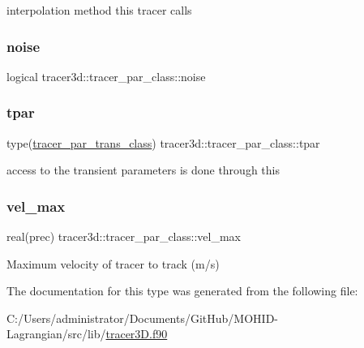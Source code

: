 interpolation method this tracer calls 

\mbox{\label{structtracer3d_1_1tracer__par__class_af258b7ca349ce911511dbd89b24606f7}} 
\subsubsection{\texorpdfstring{noise}{noise}}
{\footnotesize\ttfamily logical tracer3d\+::tracer\+\_\+par\+\_\+class\+::noise\hspace{0.3cm}{\ttfamily [private]}}

\mbox{\label{structtracer3d_1_1tracer__par__class_a4486f0959101435f0fdeb1c845d4bbf4}} 
\subsubsection{\texorpdfstring{tpar}{tpar}}
{\footnotesize\ttfamily type(\mbox{\hyperlink{structtracer3d_1_1tracer__par__trans__class}{tracer\+\_\+par\+\_\+trans\+\_\+class}}) tracer3d\+::tracer\+\_\+par\+\_\+class\+::tpar\hspace{0.3cm}{\ttfamily [private]}}



access to the transient parameters is done through this 

\mbox{\label{structtracer3d_1_1tracer__par__class_a25440b3bfbbc78ea434761725f1f3b4a}} 
\subsubsection{\texorpdfstring{vel\+\_\+max}{vel\_max}}
{\footnotesize\ttfamily real(prec) tracer3d\+::tracer\+\_\+par\+\_\+class\+::vel\+\_\+max\hspace{0.3cm}{\ttfamily [private]}}



Maximum velocity of tracer to track (m/s) 



The documentation for this type was generated from the following file\+:\begin{DoxyCompactItemize}
\item 
C\+:/\+Users/administrator/\+Documents/\+Git\+Hub/\+M\+O\+H\+I\+D-\/\+Lagrangian/src/lib/\mbox{\hyperlink{tracer3_d_8f90}{tracer3\+D.\+f90}}\end{DoxyCompactItemize}
